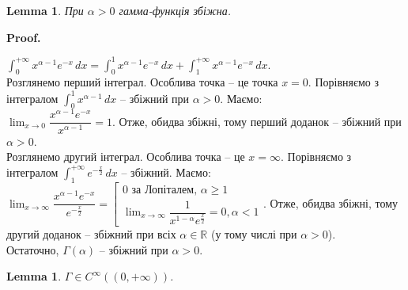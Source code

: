 \documentclass[a4paper, 10pt]{article}
\makeatletter
\def\huge{\displaystyle}
\theoremstyle{theoremdd}
\theoremstyle{theoremdd}
\theoremstyle{theoremdd}
\theoremstyle{theoremdd}
\theoremstyle{theoremdd}
\theoremstyle{theoremdd}
\theoremstyle{theoremdd}
\theoremstyle{theoremdd}
\newtheorem{lemma}[theorem]{Lemma}
\theoremstyle{theoremdd}
\renewenvironment{proof}[1][Proof.\\]{\par
\pushQED{\hfill \qed}%
\normalfont \topsep6\p@\@plus6\p@\relax
\trivlist
\item\relax
{\bfseries
#1\@addpunct{.}}\hspace\labelsep\ignorespaces
}{%
\popQED\endtrivlist\@endpefalse
}
\makeatother
\begin{document}
\begin{lemma}
При $\alpha > 0$ гамма-функція збіжна.
\end{lemma}

\begin{proof}
$\huge \int_0^{+\infty} x^{\alpha-1}e^{-x}\,dx = \int_0^1 x^{\alpha-1}e^{-x}\,dx + \int_1^{+\infty} x^{\alpha-1}e^{-x}\,dx$.\\
Розглянемо перший інтеграл. Особлива точка -- це точка $x = 0$. Порівняємо з інтегралом $\huge \int_0^1 x^{\alpha-1}\,dx$ -- збіжний при $\alpha > 0$. Маємо:\\
$\huge \lim_{x \to 0} \dfrac{x^{\alpha-1} e^{-x}}{x^{\alpha -1}} = 1$. Отже, обидва збіжні, тому перший доданок -- збіжний при $\alpha > 0$.\\
Розглянемо другий інтеграл. Особлива точка -- це $x = \infty$. Порівняємо з інтегралом $\huge \int_1^{+\infty} e^{-\frac{x}{2}} \,dx$ -- збіжний. Маємо:\\
$\huge \lim_{x \to \infty} \dfrac{x^{\alpha -1} e^{-x}}{ e^{-\frac{x}{2}}} = \left[ \begin{gathered} 0 \textrm{ за Лопіталем, } \alpha \geq 1 \\ \huge \lim_{x \to \infty} \dfrac{1}{x^{1-\alpha} e^{\frac{x}{2}}} = 0, \alpha < 1 \end{gathered} \right.$. Отже, обидва збіжні, тому другий доданок -- збіжний при всіх $\alpha \in \mathbb{R}$ (у тому числі при $\alpha > 0$).\\
Остаточно, $\Gamma(\alpha)$ -- збіжний при $\alpha > 0$.
\end{proof}

\begin{lemma}
$\Gamma \in C^{\infty} ((0,+\infty))$.
\end{lemma}
\end{document}
